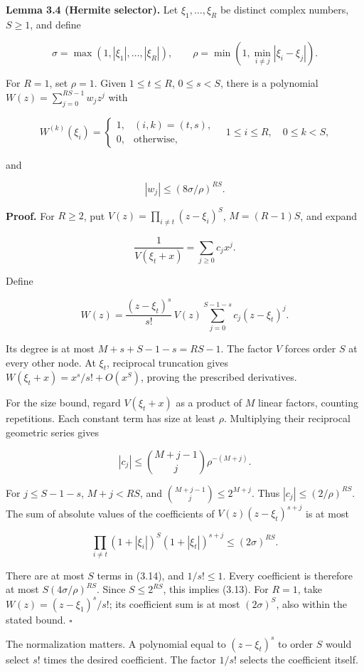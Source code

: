 \documentclass[
  11pt,
  a4paper,
]{article}
\begin{document}
\textbf{Lemma 3.4 (Hermite selector).} Let \(\xi_1,\ldots,\xi_R\) be
distinct complex numbers, \(S\ge1\), and define

\[
\sigma=\max(1,|\xi_1|,\ldots,|\xi_R|),\qquad
\rho=\min(1,\min_{i\ne j}|\xi_i-\xi_j|).
\]

For \(R=1\), set \(\rho=1\). Given \(1\le t\le R\), \(0\le s<S\), there
is a polynomial \(W(z)=\sum_{j=0}^{RS-1}w_jz^j\) with

\[
W^{(k)}(\xi_i)=\begin{cases}1,&(i,k)=(t,s),\\0,&\text{otherwise},\end{cases}
\quad 1\le i\le R,\quad 0\le k<S,
\]

and

\[
|w_j|\le(8\sigma/\rho)^{RS}. \tag{3.13}
\]

\textbf{Proof.} For \(R\ge2\), put \(V(z)=\prod_{i\ne t}(z-\xi_i)^S\),
\(M=(R-1)S\), and expand

\[
\frac1{V(\xi_t+x)}=\sum_{j\ge0}c_jx^j.
\]

Define

\[
W(z)=\frac{(z-\xi_t)^s}{s!}\,V(z)
\sum_{j=0}^{S-1-s}c_j(z-\xi_t)^j. \tag{3.14}
\]

Its degree is at most \(M+s+S-1-s=RS-1\). The factor \(V\) forces order
\(S\) at every other node. At \(\xi_t\), reciprocal truncation gives
\(W(\xi_t+x)=x^s/s!+O(x^S)\), proving the prescribed derivatives.

For the size bound, regard \(V(\xi_t+x)\) as a product of \(M\) linear
factors, counting repetitions. Each constant term has size at least
\(\rho\). Multiplying their reciprocal geometric series gives

\[
|c_j|\le\binom{M+j-1}{j}\rho^{-(M+j)}.
\]

For \(j\le S-1-s\), \(M+j<RS\), and \(\binom{M+j-1}{j}\le2^{M+j}\). Thus
\(|c_j|\le(2/\rho)^{RS}\). The sum of absolute values of the
coefficients of \(V(z)(z-\xi_t)^{s+j}\) is at most

\[
\prod_{i\ne t}(1+|\xi_i|)^S(1+|\xi_t|)^{s+j}\le(2\sigma)^{RS}.
\]

There are at most \(S\) terms in (3.14), and \(1/s!\le1\). Every
coefficient is therefore at most \(S(4\sigma/\rho)^{RS}\). Since
\(S\le2^{RS}\), this implies (3.13). For \(R=1\), take
\(W(z)=(z-\xi_1)^s/s!\); its coefficient sum is at most \((2\sigma)^S\),
also within the stated bound. \(\square\)

The normalization matters. A polynomial equal to \((z-\xi_t)^s\) to
order \(S\) would select \(s!\) times the desired coefficient. The
factor \(1/s!\) selects the coefficient itself.
\end{document}
